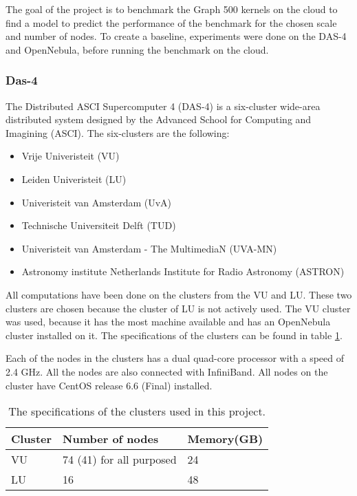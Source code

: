 
The goal of the project is to benchmark the Graph 500 kernels on the cloud to find a model to predict the performance of the benchmark for the chosen scale and number of nodes. To create a baseline, experiments were done on the DAS-4 and OpenNebula, before running the benchmark on the cloud.
\subsubsection{Das-4}
\label{hw:das4}
The Distributed ASCI Supercomputer 4 (DAS-4) is a six-cluster wide-area distributed system designed by the Advanced School for Computing and Imagining (ASCI)\cite{das-4}. The six-clusters are the following:
\begin{itemize}
\item Vrije Univeristeit (VU)
\item Leiden Univeristeit (LU)
\item Univeristeit van Amsterdam (UvA) 
\item Technische Universiteit Delft (TUD)
\item Univeristeit van Amsterdam - The MultimediaN (UVA-MN) 
\item Astronomy institute Netherlands Institute for Radio Astronomy (ASTRON)
\end{itemize}
All computations have been done on the clusters from the VU and LU. These two clusters are chosen because the cluster of LU is not actively used. The VU cluster was used, because it has the most machine available and has an OpenNebula cluster installed on it. The specifications of the clusters can be found in table \ref{tab:das-clusters}. 

Each of the nodes in the clusters has a dual quad-core processor with a speed of 2.4 GHz. All the nodes are also connected with InfiniBand\cite{infiniband}. All nodes on the cluster have CentOS release 6.6 (Final) installed.
\begin{table}[!h]
	\begin{center}
\begin{tabular}{|l|l|l|}
\hline
Cluster & Number of nodes  & Memory(GB) \\ \hline
VU 		& 74 (41) for all purposed	 & 24			\\ \hline
LU		& 16 & 48 \\ \hline
\end{tabular}
\end{center}
\caption{The specifications of the clusters used in this project.}
\label{tab:das-clusters}
\end{table}



